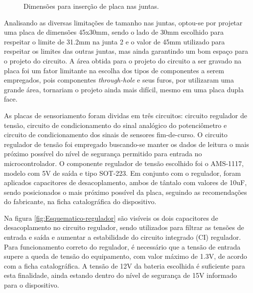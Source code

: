 \begin{figure}[ht!]
\begin{centering}
\caption{Dimensões para inserção de placa nas juntas.}
\label{fig:dimensoes-pcb1}

\par\end{centering}
\end{figure}

Analisando as diversas limitações de tamanho nas juntas, optou-se
por projetar uma placa de dimensões 45x30mm, sendo o lado de 30mm escolhido
para respeitar o limite de 31.2mm na junta 2 e o valor de 45mm utilizado para 
respeitar os limites das outras juntas, mas ainda garantindo um bom espaço para
o projeto do circuito.
A área obtida para o projeto do circuito a ser gravado na placa foi um fator
limitante na escolha dos tipos de componentes a serem empregados, pois 
componentes \textit{through-hole} e seus furos, por utilizaram uma grande área, 
tornariam o projeto ainda mais difícil, mesmo em uma placa dupla face.

As placas de sensoriamento foram dividas em três circuitos: circuito regulador
de tensão, circuito de condicionamento do sinal analógico do potenciômetro e 
circuito de condicionamento dos sinais de sensores fim-de-curso. O circuito 
regulador de tensão foi empregado buscando-se manter os dados de leitura o
mais próximo possível do nível de segurança permitido para entrada no 
microcontrolador. O componente regulador de tensão escolhido foi o AMS-1117, 
modelo com 5V de saída e tipo SOT-223. Em conjunto com o regulador, foram
aplicados capacitores de desacoplamento, ambos de tântalo com valores de 
10uF, sendo posicionados o mais próximo possível da placa, seguindo as
recomendações do fabricante, na ficha catalográfica do dispositivo.

Na figura \ref{fig:Esquematico-regulador} são visíveis os dois capacitores
de desacoplamento no circuito regulador, sendo utilizados para filtrar
as tensões de entrada e saída e aumentar a estabilidade do circuito integrado
(CI) regulador. Para funcionamento correto do regulador, é necessário que 
a tensão de entrada supere a queda de tensão do equipamento, com valor máximo de 1.3V, de
acordo com a ficha catalográfica. A tensão de 12V da bateria escolhida é suficiente
para esta finalidade, ainda estando dentro do nível de segurança de 15V informado
para o dispositivo.

